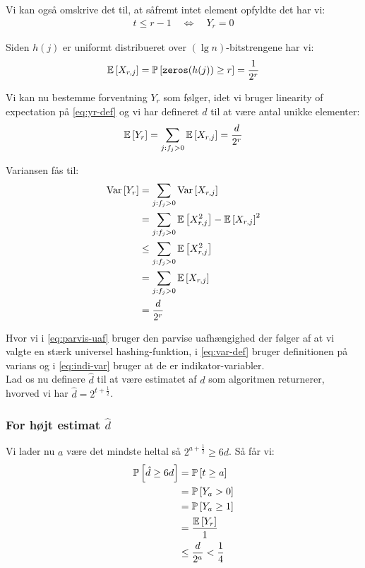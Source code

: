 Vi kan også omskrive det til, at såfremt intet element opfyldte det har vi:
\begin{align}
  t \leq r - 1 \quad \Longleftrightarrow \quad Y_r = 0 \label{eq:t-leq-r}
\end{align}

Siden $h(j)$ er uniformt distribueret over $(\lg n)$-bitstrengene har vi:
$$
\mathbb{E} \left[  X_{r,j}  \right] = \mathbb{P} \left[  \mathtt{zeros}(h(j)) \geq r  \right] = \frac{1}{2^r}
$$

Vi kan nu bestemme forventning $Y_r$ som følger, idet vi bruger linearity of expectation på \cref{eq:yr-def} og vi har defineret $d$ til at være antal unikke elementer:
\begin{align}
  \mathbb{E} \left[  Y_r  \right] = \sum_{j: f_j > 0} \mathbb{E} \left[  X_{r,j}  \right] = \frac{d}{2^r}
\end{align}


Variansen fås til:
\begin{align}
  \text{Var} \left[  Y_r  \right]
  &= \sum_{j: f_j > 0} \text{Var} \left[  X_{r,j}  \right] \label{eq:parvis-uaf} \\
  &= \sum_{j: f_j > 0} \mathbb{E} \left[  X_{r,j}^2  \right] - \mathbb{E} \left[  X_{r,j}  \right]^2 \label{eq:var-def} \\
  &\leq \sum_{j: f_j > 0} \mathbb{E} \left[  X_{r,j}^2  \right] \nonumber \\
  &= \sum_{j: f_j > 0} \mathbb{E} \left[  X_{r,j}  \right] \label{eq:indi-var} \\
  &= \frac{d}{2^r} \nonumber
\end{align}

Hvor vi i \cref{eq:parvis-uaf} bruger den parvise uafhængighed der følger af at vi valgte en stærk universel hashing-funktion, i \cref{eq:var-def} bruger definitionen på varians og i \cref{eq:indi-var} bruger at de er indikator-variabler.\\

Lad os nu definere $\hat d$ til at være estimatet af $d$ som algoritmen returnerer, hvorved vi har $\hat d = 2^{t + \frac{1}{2}}$.

\subsubsection{For højt estimat $\hat d$}
Vi lader nu $a$ være det mindste heltal så $2^{a + \frac{1}{2}} \geq 6d$. Så får vi:
\begin{align}
  \mathbb{P} \left[  \hat d \geq 6d  \right]
  &= \mathbb{P} \left[  t \geq a  \right] \label{eq:t-stoerre-a} \\
  &= \mathbb{P} \left[  Y_a > 0  \right] \label{eq:benyt-ulighed} \\
  &= \mathbb{P} \left[  Y_a \geq 1  \right] \nonumber \\
  &= \frac{\mathbb{E} \left[  Y_r  \right]}{1} \label{eq:benyt-markov} \\
  &\leq \frac{d}{2^a} < \frac{1}{4} \label{eq:benyt-forventet-yr}
\end{align}

